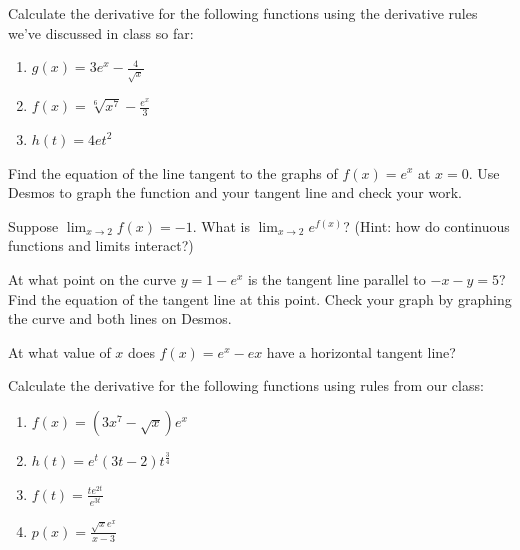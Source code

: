 \documentclass{ximera}
\begin{document}
\begin{exercise}
    Calculate the derivative for the following functions using the derivative rules we've discussed in class so far: 
        \begin{enumerate}
            \item $g(x)=3e^x-\frac{4}{\sqrt{x}}$
            \item $f(x)=\sqrt[6]{x^7} -\frac{e^x}{3}$
            \item $h(t)=4et^2$
    
        \end{enumerate}
    \end{exercise}

\begin{exercise}
    Find the equation of the line tangent to the graphs of $f(x)=e^x$ at $x=0$.  Use Desmos to graph the function and your tangent line and check your work.
\end{exercise}

\begin{exercise}
    Suppose $\displaystyle \lim_{x\rightarrow 2} f(x)=-1$. 
    What is $\displaystyle \lim_{x\rightarrow 2}e^{f(x)}$? (Hint: how do continuous functions and limits interact?)
\end{exercise}


\begin{exercise}
    At what point on the curve $y=1-e^x$ is the tangent line parallel to $-x-y=5$?   Find the equation of the tangent line at this point.  Check your graph by graphing the curve and both lines on Desmos.
\end{exercise} 

\begin{exercise}
    At what value of $x$ does $f(x)=e^x-ex$ have a horizontal tangent line? 
\end{exercise}

\begin{exercise}
    Calculate the derivative for the following functions using rules from our class: 
        \begin{enumerate}
            \item $f(x)=(3x^7-\sqrt{x})e^x$
       
            \item $h(t)=e^t(3t-2)t^{\frac{3}{4}}$
       
            \item $f(t)=\frac{te^{2t}}{e^{3t}}$
        
            \item $p(x)=\frac{\sqrt{x}e^x}{x-3}$
        
    \end{enumerate}
\end{exercise}
\end{document}

